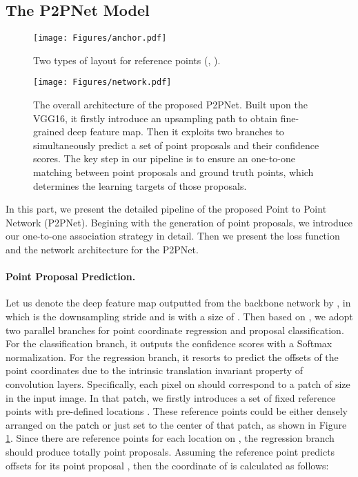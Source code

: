 \documentclass[10pt,twocolumn,letterpaper]{article}
\begin{document}
\subsection{The P2PNet Model}\label{label_p2p}
\begin{figure}[t!]
    \centering
    \texttt{[image: Figures/anchor.pdf]}
    \caption{Two types of layout for reference points (, ).}
    \label{fig4}
    \vspace{-1.0em}
\end{figure}
\begin{figure*}[t!] 
  \centering
  \texttt{[image: Figures/network.pdf]}
  \vspace{-0.8em}
  \caption{The overall architecture of the proposed P2PNet. Built upon the VGG16, it firstly introduce an upsampling path to obtain fine-grained deep feature map. Then it exploits two branches to simultaneously predict a set of point proposals and their confidence scores. The key step in our pipeline is to ensure an one-to-one matching between point proposals and ground truth points, which determines the learning targets of those proposals.}
  \label{fig5} 
  \vspace{-1.5em}
\end{figure*}
In this part, we present the detailed pipeline of the proposed Point to Point Network (P2PNet). Begining with the generation of point proposals, we introduce our one-to-one association strategy in detail. Then we present the loss function and the network architecture for the P2PNet.
\vspace{-1.0em}\paragraph{Point Proposal Prediction.} Let us denote the deep feature map outputted from the backbone network by , in which  is the downsampling stride and  is with a size of . Then based on , we adopt two parallel branches for point coordinate regression and proposal classification. For the classification branch, it outputs the confidence scores with a Softmax normalization. For the regression branch, it resorts to predict the offsets of the point coordinates due to the intrinsic translation invariant property of convolution layers. Specifically, each pixel on  should correspond to a patch of size  in the input image. In that patch, we firstly introduces a set of fixed reference points  with pre-defined locations . These reference points could be either densely arranged on the patch or just set to the center of that patch, as shown in Figure \ref{fig4}. Since there are  reference points for each location on , the regression branch should produce totally  point proposals. Assuming the reference point  predicts offsets  for its point proposal , then the coordinate of  is calculated as follows:
 
\end{document}
